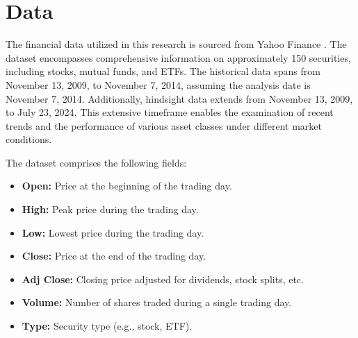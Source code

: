\section{Data}
The financial data utilized in this research is sourced from Yahoo Finance \citep{yfinance}. The dataset encompasses comprehensive information on approximately 150 securities, including stocks, mutual funds, and ETFs. The historical data spans from November 13, 2009, to November 7, 2014, assuming the analysis date is November 7, 2014. Additionally, hindsight data extends from November 13, 2009, to July 23, 2024. This extensive timeframe enables the examination of recent trends and the performance of various asset classes under different market conditions.

\vspace{1em}

The dataset comprises the following fields:
\begin{itemize}
    \item \textbf{Open:} Price at the beginning of the trading day.
    \item \textbf{High:} Peak price during the trading day.
    \item \textbf{Low:} Lowest price during the trading day.
    \item \textbf{Close:} Price at the end of the trading day.
    \item \textbf{Adj Close:} Closing price adjusted for dividends, stock splits, etc.
    \item \textbf{Volume:} Number of shares traded during a single trading day.
    \item \textbf{Type:} Security type (e.g., stock, ETF).
\end{itemize}

\newpage
